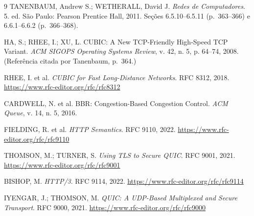 \documentclass[12pt,a4paper]{article}
\begin{document}
\begin{thebibliography}{9}
TANENBAUM, Andrew S.; WETHERALL, David J.
\textit{Redes de Computadores}. 5. ed. São Paulo: Pearson Prentice Hall, 2011.
Seções 6.5.10--6.5.11 (p.~363--366) e 6.6.1--6.6.2 (p.~366--368).

HA, S.; RHEE, I.; XU, L. CUBIC: A New TCP-Friendly High-Speed TCP Variant.
\textit{ACM SIGOPS Operating Systems Review}, v. 42, n. 5, p. 64--74, 2008.
(Referência citada por Tanenbaum, p.~364.)

RHEE, I. et al. \textit{CUBIC for Fast Long-Distance Networks}. RFC 8312, 2018.
\url{https://www.rfc-editor.org/rfc/rfc8312}

CARDWELL, N. et al. BBR: Congestion-Based Congestion Control.
\textit{ACM Queue}, v. 14, n. 5, 2016.

FIELDING, R. et al. \textit{HTTP Semantics}. RFC 9110, 2022.
\url{https://www.rfc-editor.org/rfc/rfc9110}

THOMSON, M.; TURNER, S. \textit{Using TLS to Secure QUIC}. RFC 9001, 2021.
\url{https://www.rfc-editor.org/rfc/rfc9001}

BISHOP, M. \textit{HTTP/3}. RFC 9114, 2022.
\url{https://www.rfc-editor.org/rfc/rfc9114}

IYENGAR, J.; THOMSON, M. \textit{QUIC: A UDP-Based Multiplexed and Secure Transport}.
RFC 9000, 2021. \url{https://www.rfc-editor.org/rfc/rfc9000}
\end{thebibliography}
\end{document}
